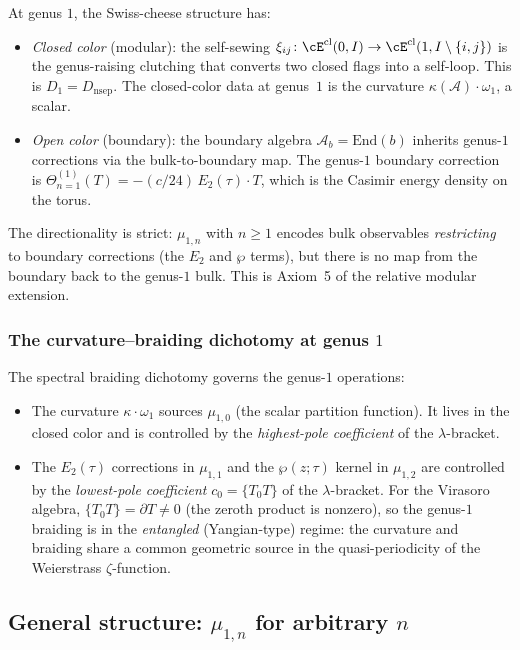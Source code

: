 \documentclass[11pt]{article}
\newcommand{\cA}{\mathcal{A}}
\begin{document}
At genus $1$, the Swiss-cheese structure has:
\begin{itemize}[leftmargin=1.8em]
\item \emph{Closed color} (modular): the self-sewing
  $\xi_{ij} \colon \cE^{\mathrm{cl}}(0,I) \to
  \cE^{\mathrm{cl}}(1, I \setminus \{i,j\})$
  is the genus-raising clutching that converts two closed flags
  into a self-loop.  This is $D_1 = D_{\mathrm{nsep}}$.
  The closed-color data at genus~$1$ is the curvature
  $\kappa(\cA) \cdot \omega_1$, a scalar.
\item \emph{Open color} (boundary): the boundary algebra
  $\cA_b = \mathrm{End}(b)$ inherits genus-$1$ corrections via
  the bulk-to-boundary map.  The genus-$1$ boundary correction is
  $\Theta^{(1)}_{n=1}(T) = -(c/24)\,E_2(\tau) \cdot T$, which
  is the Casimir energy density on the torus.
\end{itemize}

The directionality is strict: $\mu_{1,n}$ with $n \geq 1$ encodes
bulk observables \emph{restricting} to boundary corrections
(the $E_2$ and $\wp$ terms), but there is no map from the boundary
back to the genus-$1$ bulk.  This is Axiom~5 of the relative
modular extension.

\subsubsection{The curvature--braiding dichotomy at genus $1$}

The spectral braiding dichotomy governs the genus-$1$ operations:
\begin{itemize}[leftmargin=1.8em]
\item The curvature $\kappa \cdot \omega_1$ sources $\mu_{1,0}$
  (the scalar partition function).  It lives in the closed color
  and is controlled by the \emph{highest-pole coefficient}
  of the $\lambda$-bracket.
\item The $E_2(\tau)$ corrections in $\mu_{1,1}$ and the
  $\wp(z;\tau)$ kernel in $\mu_{1,2}$ are controlled by
  the \emph{lowest-pole coefficient} $c_0 = \{T {}_0 T\}$
  of the $\lambda$-bracket.  For the Virasoro algebra,
  $\{T {}_0 T\} = \partial T \neq 0$ (the zeroth product is
  nonzero), so the genus-$1$ braiding is in the
  \emph{entangled} (Yangian-type) regime: the curvature and
  braiding share a common geometric source in the
  quasi-periodicity of the Weierstrass $\zeta$-function.
\end{itemize}

\subsection{General structure: $\mu_{1,n}$ for arbitrary $n$}
\end{document}
